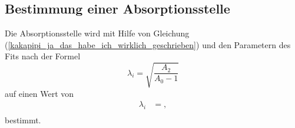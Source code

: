 \subsection{Bestimmung einer Absorptionsstelle}
Die Absorptionsstelle wird mit Hilfe von Gleichung (\ref{kakapipi_ja_das_habe_ich_wirklich_geschrieben}) und den Parametern des Fits nach der Formel
\begin{equation}
  \lambda_i = \sqrt{\frac{A_2}{A_0-1}}
\end{equation}
auf einen Wert von
\begin{align*}
  \lambda_i &= ,\\
\end{align*}
bestimmt.
